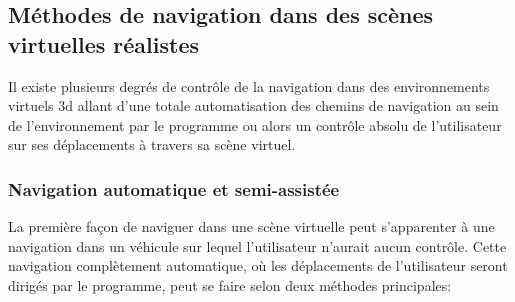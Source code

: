 
\subsection{Méthodes de navigation dans des scènes virtuelles réalistes}

Il existe plusieurs degrés de contrôle de la navigation dans des environnements virtuels 3d allant d'une totale automatisation des chemins de navigation au sein de l'environnement par le programme ou alors un contrôle absolu de l'utilisateur sur ses déplacements à travers sa scène virtuel.

\subsubsection{Navigation automatique et semi-assistée}

La première façon de naviguer dans une scène virtuelle peut s'apparenter à une navigation dans un véhicule sur lequel l'utilisateur n'aurait aucun contrôle. Cette navigation complètement automatique, où les déplacements de l'utilisateur seront dirigés par le programme, peut se faire selon deux méthodes principales:


